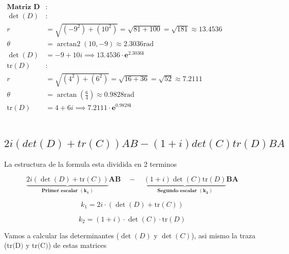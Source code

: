 \documentclass[11pt]{article}
\begin{document}
    $\displaystyle 
    \begin{aligned}
    \mathbf{\text{Matriz } D} &: \\
    \det(D) &: \\
    r &= \sqrt{(-9^2) + (10^2)} = \sqrt{81 + 100} = \sqrt{181} \approx 13.4536 \\
    \theta &= \operatorname{arctan2}(10,-9) \approx 2.3036 \text{rad} \\
    \det(D) &= -9 + 10i \implies \mathbf{13.4536 \cdot e^{2.3036i}} \\
    \text{tr}(D) &: \\
    r &= \sqrt{(4^2) + (6^2)} = \sqrt{16 + 36} = \sqrt{52} \approx 7.2111 \\
    \theta &= \operatorname{arctan}\left(\frac{6}{4}\right) \approx 0.9828 \text{rad} \\
    \text{tr}(D) &= 4 + 6i \implies \mathbf{7.2111 \cdot e^{0.9828i}}
    \end{aligned}
    $

    
    \begin{Verbatim}[commandchars=\\\{\}]

    \end{Verbatim}

    \subsection{\texorpdfstring{\(2i(det(D)+tr(C))AB-(1+i)  det⁡(C)tr(D)BA\)}{2i(det(D)+tr(C))AB-(1+i)  det⁡(C)tr(D)BA}}\label{idetdtrcab-1i-detctrdba}

La estructura de la formula esta dividida en 2 terminos

\[\underbrace{2i(\det(D) + \text{tr}(C))}_{\mathbf{\text{Primer escalar } (k_1)}} \mathbf{AB} \quad - \quad \underbrace{(1+i)\det(C)\text{tr}(D)}_{\mathbf{\text{Segundo escalar } (k_2)}} \mathbf{BA}\]

\[k_1 = 2i \cdot (\det(D) + \text{tr}(C))\]

\[k_2 = (1+i) \cdot \det(C) \cdot \text{tr}(D)\]

Vamos a calcular las determinantes (\(\det(D)\) y \(\det(C)\)), asi
mismo la traza (\(\text{tr(D)}\) y \(\text{tr(C)}\)) de estas matrices
\end{document}
